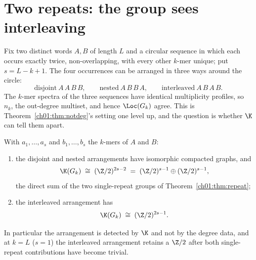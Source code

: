 \section{Two repeats: the group sees interleaving}\label{ch01:sec:interleave}

Fix two distinct words $A,B$ of length $L$ and a circular sequence in which each occurs
exactly twice, non-overlapping, with every other $k$-mer unique; put $s=L-k+1$. The four
occurrences can be arranged in three ways around the circle:
\[
\text{disjoint}\ A\,A\,B\,B,\qquad \text{nested}\ A\,B\,B\,A,\qquad
\text{interleaved}\ A\,B\,A\,B.
\]
The $k$-mer spectra of the three sequences have identical multiplicity profiles, so
$n_k$, the out-degree multiset, and hence $\Loc(G_k)$ agree. This is Theorem~\ref{ch01:thm:notdeg}'s
setting one level up, and the question is whether $\K$ can tell them apart.

\begin{theorem}\label{ch01:thm:interleave}
With $a_1,\dots,a_s$ and $b_1,\dots,b_s$ the $k$-mers of $A$ and $B$:
\begin{enumerate}
\item[(i)] the disjoint and nested arrangements have isomorphic compacted graphs, and
\[
\K(G_k)\;\cong\;(\Z/2)^{2s-2}\;=\;(\Z/2)^{s-1}\oplus(\Z/2)^{s-1},
\]
the direct sum of the two single-repeat groups of Theorem~\ref{ch01:thm:repeat};
\item[(ii)] the interleaved arrangement has
\[
\K(G_k)\;\cong\;(\Z/2)^{2s-1}.
\]
\end{enumerate}
In particular the arrangement is detected by $\K$ and not by the degree data, and at
$k=L$ ($s=1$) the interleaved arrangement retains a $\Z/2$ after both single-repeat
contributions have become trivial.
\end{theorem}

